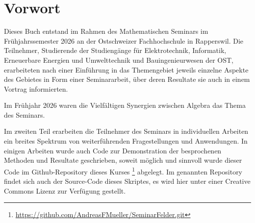 %
%
%
\chapter*{Vorwort}

\noindent
Dieses Buch entstand im Rahmen des Mathematischen Seminars
im Frühjahrssemester 2026 an der Ostschweizer Fachhochschule in Rapperswil.
Die Teilnehmer, Studierende der Studiengänge für Elektrotechnik, Informatik,
Erneuerbare Energien und Umwelttechnik und Bauingenieurwesen
der OST, erarbeiteten nach einer Einführung in das Themengebiet jeweils
einzelne Aspekte des Gebietes in Form einer Seminararbeit, über
deren Resultate sie auch in einem Vortrag informierten. 

Im Frühjahr 2026 waren die Vielfältigen Synergien zwischen Algebra
das Thema des Seminars.

Im zweiten Teil erarbeiten die Teilnehmer des Seminars in individuellen
Arbeiten ein breites Spektrum von weiterführenden Fragestellungen
und Anwendungen.
In einigen Arbeiten wurde auch Code zur Demonstration der 
besprochenen Methoden und Resultate geschrieben, soweit
möglich und sinnvoll wurde dieser Code im Github-Repository
%
dieses Kurses%
\footnote{\url{https://github.com/AndreasFMueller/SeminarFelder.git}}
\cite{buch:repo}
abgelegt.
Im genannten Repository findet sich auch der Source-Code dieses
Skriptes, es wird hier unter einer Creative Commons Lizenz
zur Verfügung gestellt.

